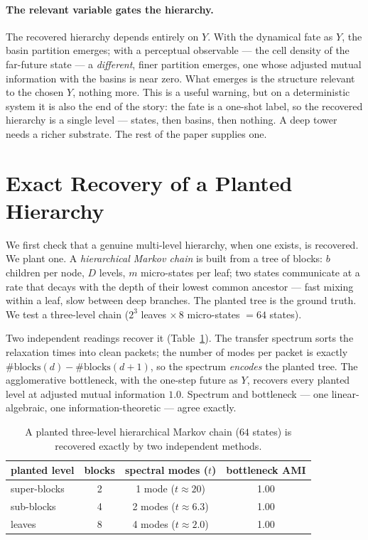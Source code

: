 \documentclass[11pt]{article}
\begin{document}
\paragraph{The relevant variable gates the hierarchy.}
The recovered hierarchy depends entirely on $Y$. With the dynamical fate as
$Y$, the basin partition emerges; with a perceptual observable --- the cell
density of the far-future state --- a \emph{different}, finer partition emerges,
one whose adjusted mutual information with the basins is near zero. What
emerges is the structure relevant to the chosen $Y$, nothing more. This is a
useful warning, but on a deterministic system it is also the end of the story:
the fate is a one-shot label, so the recovered hierarchy is a single level ---
states, then basins, then nothing. A deep tower needs a richer substrate. The
rest of the paper supplies one.

\section{Exact Recovery of a Planted Hierarchy}
\label{sec:planted}

We first check that a genuine multi-level hierarchy, when one exists, is
recovered. We plant one. A \emph{hierarchical Markov chain} is built from a
tree of blocks: $b$ children per node, $D$ levels, $m$ micro-states per leaf;
two states communicate at a rate that decays with the depth of their lowest
common ancestor --- fast mixing within a leaf, slow between deep branches. The
planted tree is the ground truth. We test a three-level chain
($2^3$ leaves $\times\, 8$ micro-states $= 64$ states).

Two independent readings recover it (Table~\ref{tab:planted}). The transfer
spectrum sorts the relaxation times into clean packets; the number of modes per
packet is exactly $\#\text{blocks}(d) - \#\text{blocks}(d{+}1)$, so the spectrum
\emph{encodes} the planted tree. The agglomerative bottleneck, with the
one-step future as $Y$, recovers every planted level at adjusted mutual
information $1.0$. Spectrum and bottleneck --- one linear-algebraic, one
information-theoretic --- agree exactly.

\begin{table}[h]
\centering
\caption{A planted three-level hierarchical Markov chain ($64$ states) is
recovered exactly by two independent methods.}
\label{tab:planted}
\begin{tabular}{lccc}
\toprule
planted level & blocks & spectral modes ($t$) & bottleneck AMI \\
\midrule
super-blocks & 2 & 1 mode ($t{\approx}20$)  & 1.00 \\
sub-blocks   & 4 & 2 modes ($t{\approx}6.3$) & 1.00 \\
leaves       & 8 & 4 modes ($t{\approx}2.0$) & 1.00 \\
\bottomrule
\end{tabular}
\end{table}
\end{document}

